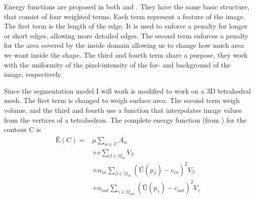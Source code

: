 
Energy functions are proposed in both \cite{cv01} and \cite{rc09}. They have the
same basic structure, that consist of four weighted terms. Each term represent a
feature of the image. The first term is the length of the edge. It is used to
enforce a penalty for longer or short edges, allowing more detailed edges. The
second term enforces a penalty for the area covered by the inside domain
allowing us to change how much area we want inside the shape. The third and
fourth term share a purpose, they work with the uniformity of the
pixel-intensity of the for- and background of the image, respectively.

Since the segmentation model I will work is modified to work on a 3D tetrahedral
mesh. The first term is changed to weigh surface area.
The second term weigh volume, and the third and fourth use a function that
interpolates image values from the vertices of a tetrahedron. The complete
energy function (from \cite{chanveseposter}) for the contour C is
\begin{align*}
  \text{Ê}(C) = &\mu \sum_{\alpha \in C}^{}A_\alpha \\
  &+ v \sum_{\beta \in \Omega_{in}}^{} V_\beta \\
  &+ \alpha_{in} \sum_{\beta \in \Omega_{in}}^{}\left(\text{Û}(p_\beta) - c_{in}  \right)^2 V_\beta \\
  &+ \alpha_{out} \sum_{\gamma \in \Omega_{out}}^{} \left(\text{Û}(p_\gamma) - c_{out} \right)^2 V_\gamma \\
\end{align*}


